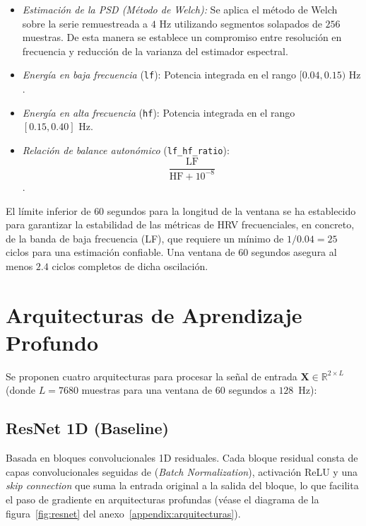 \begin{itemize}
\begin{itemize}
          \item \textit{Estimación de la PSD (Método de Welch):}
          Se aplica el método de Welch sobre la serie remuestreada a $4\text{ Hz}$
          utilizando segmentos solapados de $256$ muestras. De esta manera se establece un compromiso entre
          resolución en frecuencia y reducción de la varianza del estimador espectral.
          \item \textit{Energía en baja frecuencia} (\texttt{lf}):
          Potencia integrada en el rango $[0.04, 0.15)\text{ Hz}$.
          \item \textit{Energía en alta frecuencia} (\texttt{hf}):
          Potencia integrada en el rango $[0.15, 0.40]\text{ Hz}$.
          \item \textit{Relación de balance autonómico} (\texttt{lf\_hf\_ratio}):
          \begin{equation}
            \frac{\text{LF}}{\text{HF} + 10^{-8}}
          \end{equation}.
      \end{itemize}
      El límite inferior de $60$ segundos para la longitud de la ventana se ha establecido para garantizar la estabilidad
      de las métricas de HRV frecuenciales, en concreto, de la banda de baja frecuencia (LF),
      que requiere un mínimo de $1/0.04 = 25$ ciclos para una estimación confiable. Una ventana de $60$ segundos asegura al
      menos $2.4$ ciclos completos de dicha oscilación.

  \end{itemize}



\section{Arquitecturas de Aprendizaje Profundo}
\label{sec:arquitecturas}

Se proponen cuatro arquitecturas para procesar la señal de entrada $\mathbf{X} \in \mathbb{R}^{2 \times L}$ (donde $L = 7680$ muestras para una ventana de $60$ segundos a $128$~Hz):

\subsection{ResNet 1D (Baseline)}
Basada en bloques convolucionales 1D residuales\cite{rajpurkar2017cardiologistlevelarrhythmiadetectionconvolutional}. Cada bloque residual consta de capas
convolucionales seguidas de (\textit{Batch Normalization}),
activación ReLU y una \textit{skip connection}\cite{he2015deepresiduallearningimage} que suma la entrada
original a la salida del bloque, lo que facilita el paso de gradiente en arquitecturas profundas
(véase el diagrama de la figura~\ref{fig:resnet} del anexo~\ref{appendix:arquitecturas}).



